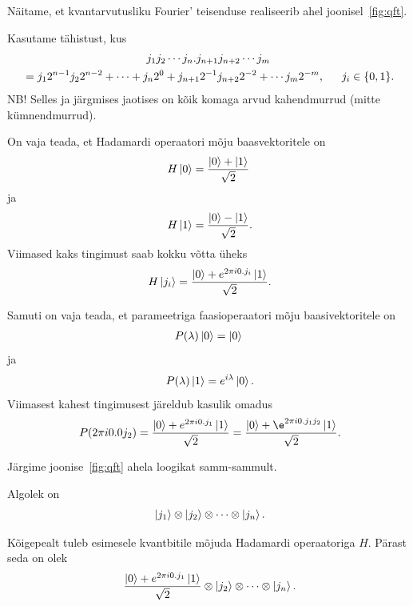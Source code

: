 \documentclass[12pt]{report}
\def\ket#1{\mathinner{|#1\rangle}}
\begin{document}
Näitame, et kvantarvutusliku Fourier' teisenduse realiseerib ahel joonisel~\ref{fig:qft}.

Kasutame tähistust, kus
\begin{multline}
    j_1j_2\cdots j_n.j_{n+1}j_{n+2}\cdots j_m \\
    = j_1 2^{n-1} j_2 2^{n-2} + \cdots + j_n 2^0 + j_{n+1} 2^{-1} j_{n+2} 2^{-2} + \cdots j_m 2^{-m} \rlap{,}
    \qquad j_i \in \{0, 1\} \rlap{.}
\end{multline}
NB! Selles ja järgmises jaotises on kõik komaga arvud kahendmurrud (mitte kümnendmurrud).

On vaja teada, et Hadamardi operaatori mõju baasvektoritele on
\begin{align}
    H\ket{0} = \frac{\ket{0} + \ket{1}}{\sqrt{2}}
\end{align}
ja
\begin{align}
    H\ket{1} = \frac{\ket{0} - \ket{1}}{\sqrt{2}} \rlap{.}
\end{align}
Viimased kaks tingimust saab kokku võtta üheks
\begin{align}
    H\ket{j_i} = \frac{\ket{0} + e^{2\pi i0.j_i}\ket{1}}{\sqrt{2}}\rlap{.}
\end{align}

Samuti on vaja teada, et parameetriga faasioperaatori mõju baasivektoritele on
\begin{align}
    P(\lambda)\ket{0} = \ket{0}
\end{align}
ja
\begin{align}
    P(\lambda)\ket{1} = e^{i\lambda}\ket{0} \rlap{.}
\end{align}
Viimasest kahest tingimusest järeldub kasulik omadus
\begin{align}\label{f:phase}
    P(2\pi i0.0j_2)=\frac{\ket{0}+e^{2\pi i0.j_1}\ket{1}}{\sqrt{2}}
    = \frac{\ket{0}+\e^{2\pi i0.j_1j_2}\ket{1}}{\sqrt{2}} \rlap{.}
\end{align}

Järgime joonise~\ref{fig:qft} ahela loogikat samm-sammult.

Algolek on
\begin{align}
    \ket{j_1} \otimes \ket{j_2} \otimes \cdots \otimes \ket{j_n} \rlap{.}
\end{align}

Kõigepealt tuleb esimesele kvantbitile mõjuda Hadamardi operaatoriga \(H\).
Pärast seda on olek
\begin{align}
    \frac{\ket{0} + e^{2\pi i0.j_1}\ket{1}}{\sqrt{2}} \otimes \ket{j_2} \otimes \cdots \otimes \ket{j_n} \rlap{.}
\end{align}
\end{document}
